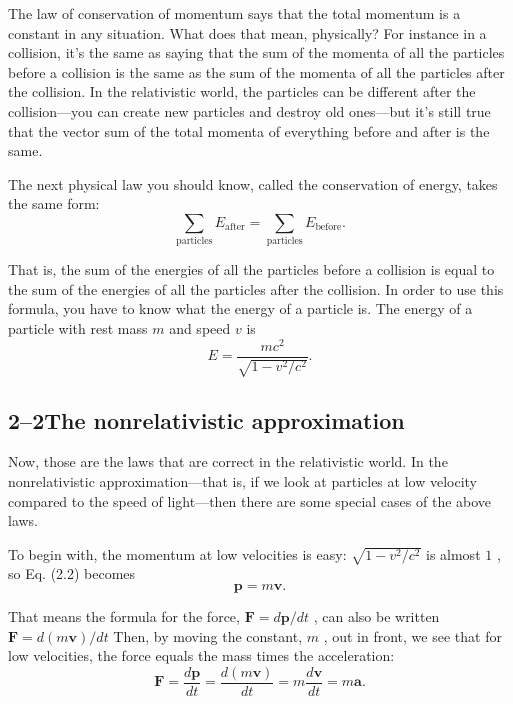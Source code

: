 \documentclass[11pt,oneside]{article}
\providecommand{\ddt}[2]{\frac{d#1}{d#2}}
\providecommand{\FLPF}{\mathbf{F}}
\providecommand{\FLPa}{\mathbf{a}}
\providecommand{\FLPp}{\mathbf{p}}
\providecommand{\FLPv}{\mathbf{v}}
\begin{document}
The law of conservation of momentum says that the total momentum is a constant in any situation. What does that mean, physically? For instance in a collision, it's the same as saying that the sum of the momenta of all the particles before a collision is the same as the sum of the momenta of all the particles after the collision. In the relativistic world, the particles can be different after the collision---you can create new particles and destroy old ones---but it's still true that the vector sum of the total momenta of everything before and after is the same.\par

The next physical law you should know, called the conservation of energy, takes the same form: 
\begin{equation*} \tag{2.4}
\label{Eq:TIPS:2:4} \sum_\text{particles} E_\text{after} = \sum_\text{particles} E_\text{before}. \end{equation*}
\par

That is, the sum of the energies of all the particles before a collision is equal to the sum of the energies of all the particles after the collision. In order to use this formula, you have to know what the energy of a particle is. The energy of a particle with rest mass \(m\) and speed \(v\) is 
\begin{equation*} \tag{2.5}
\label{Eq:TIPS:2:5} E = \frac{mc^2}{\sqrt{1-{v^2}/{c^2}}}. \end{equation*}
\par

\subsection*{2--2The nonrelativistic approximation}

Now, those are the laws that are correct in the relativistic world. In the nonrelativistic approximation---that is, if we look at particles at low velocity compared to the speed of light---then there are some special cases of the above laws.\par

To begin with, the momentum at low velocities is easy: \(\sqrt{1-{v^2}/{c^2}}\) is almost \(1\) , so Eq. (2.2) becomes 
\begin{equation*} \tag{2.6}
\label{Eq:TIPS:2:6} \FLPp = m\FLPv. \end{equation*}
\par

That means the formula for the force, \(\FLPF = d\FLPp/dt\) , can also be written \(\FLPF = d(m\FLPv)/dt\) Then, by moving the constant, \(m\) , out in front, we see that for low velocities, the force equals the mass times the acceleration: 
\begin{equation*} \tag{2.7}
\label{Eq:TIPS:2:7} \FLPF = \ddt{\FLPp}{t} = \ddt{(m\FLPv)}{t} = m\ddt{\FLPv}{t} = m\FLPa. \end{equation*}
\par
\end{document}
